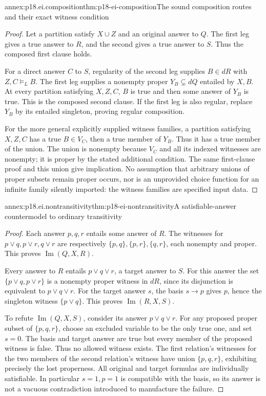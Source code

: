 \begin{annexitem}{annex:p18.ei.composition}{thm:p18-ei-composition}{The sound composition routes and their exact witness condition}
\begin{proof}
Let a partition satisfy \(X\cup Z\) and an original answer to \(Q\).
The first leg gives a true answer to \(R\), and the second gives a true
answer to \(S\). Thus the composed first clause holds.

For a direct answer \(C\) to \(S\), regularity of the second leg supplies
\(B\in dR\) with \(Z,C\models_L B\). The first leg supplies a nonempty
proper \(Y_B\subsetneq dQ\) entailed by \(X,B\). At every partition
satisfying \(X,Z,C\), \(B\) is true and then some answer of \(Y_B\) is
true. This is the composed second clause. If the first leg is also regular,
replace \(Y_B\) by its entailed singleton, proving regular composition.

For the more general explicitly supplied witness families, a partition
satisfying \(X,Z,C\) has a true \(B\in V_C\), then a true member of
\(Y_B\). Thus it has a true member of the union. The union is nonempty
because \(V_C\) and all its indexed witnesses are nonempty; it is proper by
the stated additional condition. The same first-clause proof and this union
give implication. No assumption that arbitrary unions of proper subsets
remain proper occurs, nor is an unprovided choice function for an infinite
family silently imported: the witness families are specified input data.
\end{proof}
\end{annexitem}

\begin{annexitem}{annex:p18.ei.nontransitivity}{thm:p18-ei-nontransitivity}{A satisfiable-answer countermodel to ordinary transitivity}
\begin{proof}
Each answer \(p,q,r\) entails some answer of \(R\). The witnesses for
\(p\lor q,p\lor r,q\lor r\) are respectively
\(\{p,q\},\{p,r\},\{q,r\}\), each nonempty and proper. This proves
\(\operatorname{Im}(Q,X,R)\).

Every answer to \(R\) entails \(p\lor q\lor r\), a target answer to
\(S\). For this answer the set \(\{p\lor q,p\lor r\}\) is a nonempty
proper witness in \(dR\), since its disjunction is equivalent to
\(p\lor q\lor r\). For the target answer \(s\), the basis \(s\to p\)
gives \(p\), hence the singleton witness \(\{p\lor q\}\). This proves
\(\operatorname{Im}(R,X,S)\).

To refute \(\operatorname{Im}(Q,X,S)\), consider its answer
\(p\lor q\lor r\). For any proposed proper subset of \(\{p,q,r\}\),
choose an excluded variable to be the only true one, and set \(s=0\).
The basis and target answer are true but every member of the proposed
witness is false. Thus no allowed witness exists. The first relation's
witnesses for the two members of the second relation's witness have union
\(\{p,q,r\}\), exhibiting precisely the lost properness.
All original and target formulas are individually satisfiable. In particular
\(s=1,p=1\) is compatible with the basis, so its answer is not a vacuous
contradiction introduced to manufacture the failure.
\end{proof}
\end{annexitem}

